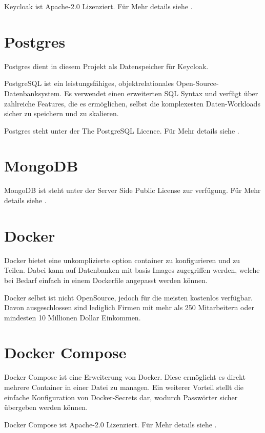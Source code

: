 Keycloak ist Apache-2.0 Lizenziert.
Für Mehr details siehe .

\section{Postgres}

Postgres dient in diesem Projekt als Datenspeicher für Keycloak.

PostgreSQL ist ein leistungsfähiges, objektrelationales Open-Source-Datenbanksystem.
Es verwendet einen erweiterten SQL Syntax und verfügt über zahlreiche Features,
die es ermöglichen, selbst die komplexesten Daten-Workloads sicher zu speichern und zu skalieren.
\cite{about-postgres}

Postgres steht unter der The PostgreSQL Licence.
Für Mehr details siehe .


\section{MongoDB}

MongoDB ist steht unter der Server Side Public License zur verfügung.
Für Mehr details siehe .

\section{Docker}

Docker bietet eine unkomplizierte option container zu konfigurieren und zu Teilen.
Dabei kann auf Datenbanken mit basis Images zugegriffen werden, welche bei Bedarf
einfach in einem Dockerfile angepasst werden können.

Docker selbst ist nicht OpenSource, jedoch für die meisten kostenlos verfügbar.
Davon ausgeschlossen sind lediglich Firmen mit mehr als 250 Mitarbeitern oder mindesten 10 Millionen Dollar Einkommen.

\section{Docker Compose}

Docker Compose ist eine Erweiterung von Docker.
Diese ermöglicht es direkt mehrere Container in einer Datei zu managen.
Ein weiterer Vorteil stellt die einfache Konfiguration von Docker-Secrets dar, wodurch \ua Passwörter sicher übergeben werden können.

Docker Compose ist Apache-2.0 Lizenziert.
Für Mehr details siehe .
